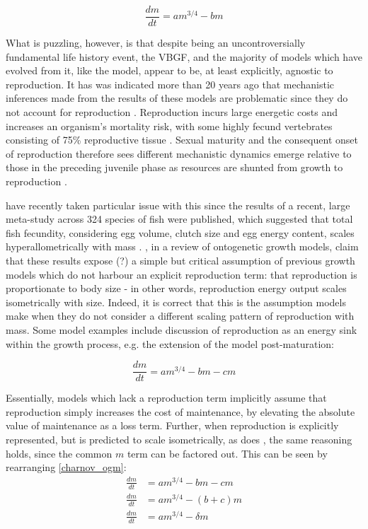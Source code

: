 \documentclass[a4paper]{article} %
\begin{document}
            \begin{equation}
                \frac{dm}{dt} = am^{3/4} - bm \label{west_ogm}
            \end{equation}

            What is puzzling, however, is that despite being an uncontroversially fundamental life history event, the VBGF, and the majority of models which have evolved from it, like the \cite{West2001} model, appear to be, at least explicitly, agnostic to reproduction. It has was indicated more than 20 years ago that mechanistic inferences made from the results of these models are problematic since they do not account for reproduction \autocite{Day1997, Marshall2019b}. Reproduction incurs large energetic costs and increases an organism's mortality risk, with some highly fecund vertebrates consisting of 75\% reproductive tissue \autocite{Parker2018}. Sexual maturity and the consequent onset of reproduction therefore sees different mechanistic dynamics emerge relative to those in the preceding juvenile phase as resources are shunted from growth to reproduction \autocite{Day1997}. 
            
            \cite{Marshall2019b} have recently taken particular issue with this since the results of a recent, large meta-study across 324 species of fish were published, which suggested that total fish fecundity, considering egg volume, clutch size and egg energy content, scales hyperallometrically with mass \autocite{Barneche2018d}. \cite{Marshall2019b}, in a review of ontogenetic growth models, claim that these results expose (?) a simple but critical assumption of previous growth models which do not harbour an explicit reproduction term: that reproduction is proportionate to body size - in other words, reproduction energy output scales isometrically with size. Indeed, it is correct that this is the assumption models make when they do not consider a different scaling pattern of reproduction with mass. Some model examples include discussion of reproduction as an energy sink within the growth process, e.g. the \cite{Charnov2001} extension of the \cite{West2001} model post-maturation:

            \begin{equation}
                \frac{dm}{dt} = am^{3/4} - bm - cm \label{charnov_ogm}
            \end{equation}

            Essentially, models which lack a reproduction term implicitly assume that reproduction simply increases the cost of maintenance, by elevating the absolute value of maintenance as a loss term. Further, when reproduction is explicitly represented, but is predicted to scale isometrically, as does \cite{Charnov2001}, the same reasoning holds, since the common $m$ term can be factored out. This can be seen by rearranging \eqref{charnov_ogm}:
            \begin{align*}
                \frac{dm}{dt} &= am^{3/4} - bm - cm \\
                \frac{dm}{dt} &= am^{3/4} - (b+c)m \\
                \frac{dm}{dt} &= am^{3/4} - \delta m
            \end{align*}
\end{document}
